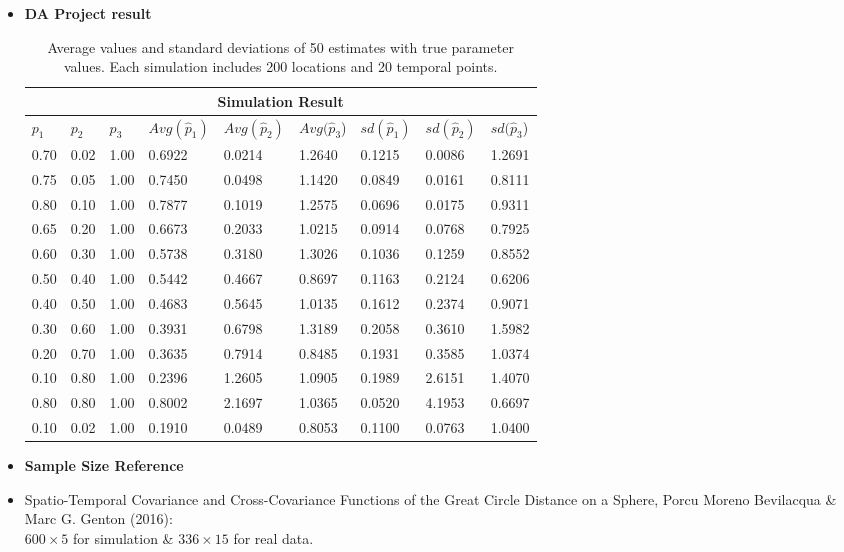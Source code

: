 \documentclass[11pt]{article}
\begin{document}
\begin{itemize}
\item
\textbf{DA Project result}\\
\begin{table}[h!]
\centering
\begin{tabular}{ |p{1cm}|p{1cm}|p{1cm}||p{1.5cm}|p{1.5cm}|p{1.5cm}||p{1.5cm}|p{1.5cm}|p{1.5cm}|}
 \hline
 \multicolumn{9}{|c|}{Simulation Result} \\
 \hline
 $p_1$ & $p_2$ & $p_3$ & $Avg(\hat{p}_1)$ & $Avg(\hat{p}_2)$  & $Avg(\hat{p}_3$)& $sd(\hat{p}_1)$ & $sd(\hat{p}_2)$  & $sd(\hat{p}_3$)\\
 \hline
 0.70& 0.02& 1.00& 0.6922& 0.0214& 1.2640& 0.1215& 0.0086& 1.2691\\
 0.75& 0.05& 1.00& 0.7450& 0.0498& 1.1420& 0.0849& 0.0161& 0.8111\\
 0.80& 0.10& 1.00& 0.7877& 0.1019& 1.2575& 0.0696& 0.0175& 0.9311\\
 0.65& 0.20& 1.00& 0.6673& 0.2033& 1.0215& 0.0914& 0.0768& 0.7925\\
 0.60& 0.30& 1.00& 0.5738& 0.3180& 1.3026& 0.1036& 0.1259& 0.8552\\
 0.50& 0.40& 1.00& 0.5442& 0.4667& 0.8697& 0.1163& 0.2124& 0.6206\\ 
 0.40& 0.50& 1.00& 0.4683& 0.5645& 1.0135& 0.1612& 0.2374& 0.9071\\ 
 0.30& 0.60& 1.00& 0.3931& 0.6798& 1.3189& 0.2058& 0.3610& 1.5982\\ 
 0.20& 0.70& 1.00& 0.3635& 0.7914& 0.8485& 0.1931& 0.3585& 1.0374\\ 
 0.10& 0.80& 1.00& 0.2396& 1.2605& 1.0905& 0.1989& 2.6151& 1.4070\\
 0.80& 0.80& 1.00& 0.8002& 2.1697& 1.0365& 0.0520& 4.1953& 0.6697\\
 0.10& 0.02& 1.00& 0.1910& 0.0489& 0.8053& 0.1100& 0.0763& 1.0400\\
 \hline
\end{tabular}
\caption{\label{tab1} Average values and standard deviations of 50 estimates with true parameter values. Each simulation includes 200 locations and 20 temporal points.}
\end{table}

\pagebreak
\item \textbf{Sample Size Reference}\\

\item 
Spatio-Temporal Covariance and Cross-Covariance Functions of the Great Circle Distance on a Sphere, Porcu Moreno Bevilacqua \& Marc G. Genton (2016): \\
$600 \times 5$ for simulation \& $336 \times 15$ for real data.\\


\end{itemize}
\end{document}
